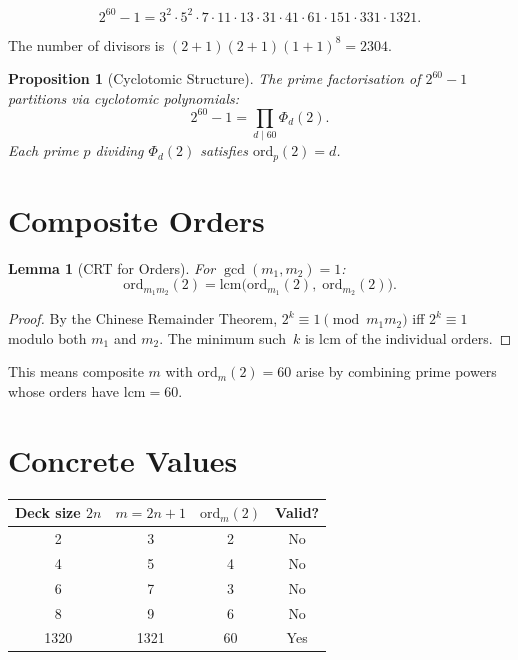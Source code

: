 \documentclass[11pt]{article}
\newtheorem{lemma}[theorem]{Lemma}
\newtheorem{proposition}[theorem]{Proposition}
\begin{document}
\begin{equation}
2^{60} - 1 = 3^2 \cdot 5^2 \cdot 7 \cdot 11 \cdot 13 \cdot 31 \cdot 41 \cdot 61 \cdot 151 \cdot 331 \cdot 1321.
\end{equation}

The number of divisors is $(2+1)(2+1)(1+1)^8 = 2304$.

\begin{proposition}[Cyclotomic Structure]
The prime factorisation of $2^{60}-1$ partitions via cyclotomic polynomials:
\[
2^{60} - 1 = \prod_{d \mid 60} \Phi_d(2).
\]
Each prime $p$ dividing $\Phi_d(2)$ satisfies $\mathrm{ord}_p(2) = d$.
\end{proposition}

\section{Composite Orders}

\begin{lemma}[CRT for Orders]
For $\gcd(m_1, m_2) = 1$:
\[
\mathrm{ord}_{m_1 m_2}(2) = \mathrm{lcm}\bigl(\mathrm{ord}_{m_1}(2),\; \mathrm{ord}_{m_2}(2)\bigr).
\]
\end{lemma}

\begin{proof}
By the Chinese Remainder Theorem, $2^k \equiv 1 \pmod{m_1 m_2}$ iff $2^k \equiv 1$ modulo both $m_1$ and $m_2$. The minimum such~$k$ is $\mathrm{lcm}$ of the individual orders.
\end{proof}

This means composite $m$ with $\mathrm{ord}_m(2) = 60$ arise by combining prime powers whose orders have $\mathrm{lcm} = 60$.

\section{Concrete Values}

\begin{center}
\begin{tabular}{cccc}
\toprule
Deck size $2n$ & $m = 2n+1$ & $\mathrm{ord}_m(2)$ & Valid? \\
\midrule
2    & 3    & 2  & No \\
4    & 5    & 4  & No \\
6    & 7    & 3  & No \\
8    & 9    & 6  & No \\
1320 & 1321 & 60 & Yes \\
\bottomrule
\end{tabular}
\end{center}
\end{document}
